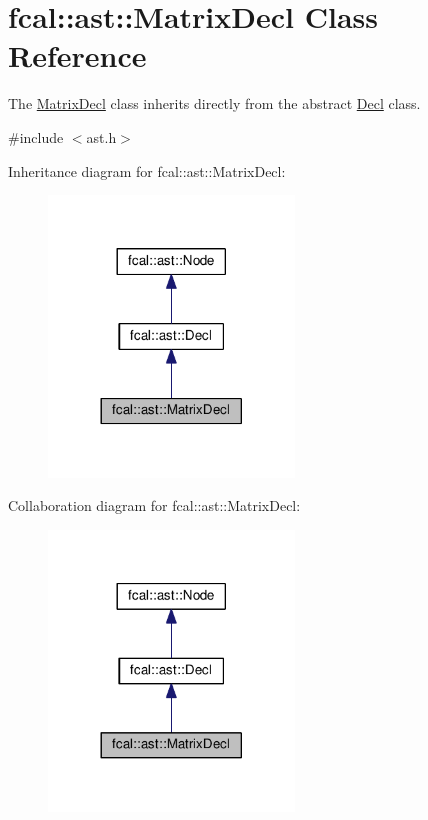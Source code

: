 \hypertarget{classfcal_1_1ast_1_1MatrixDecl}{}\section{fcal\+:\+:ast\+:\+:Matrix\+Decl Class Reference}
\label{classfcal_1_1ast_1_1MatrixDecl}


The \hyperlink{classfcal_1_1ast_1_1MatrixDecl}{Matrix\+Decl} class inherits directly from the abstract \hyperlink{classfcal_1_1ast_1_1Decl}{Decl} class.  




{\ttfamily \#include $<$ast.\+h$>$}



Inheritance diagram for fcal\+:\+:ast\+:\+:Matrix\+Decl\+:\nopagebreak
\begin{figure}[H]
\begin{center}
\leavevmode
\includegraphics[width=185pt]{classfcal_1_1ast_1_1MatrixDecl__inherit__graph}
\end{center}
\end{figure}


Collaboration diagram for fcal\+:\+:ast\+:\+:Matrix\+Decl\+:\nopagebreak
\begin{figure}[H]
\begin{center}
\leavevmode
\includegraphics[width=185pt]{classfcal_1_1ast_1_1MatrixDecl__coll__graph}
\end{center}
\end{figure}

